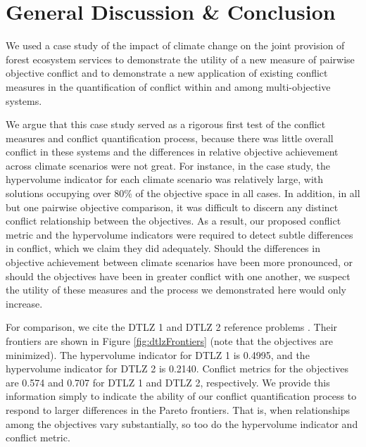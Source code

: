 \chapter{General Discussion \& Conclusion}
We used a case study of the impact of climate change on the joint provision of forest ecosystem services to demonstrate the utility of a new measure of pairwise objective conflict and to demonstrate a new application of existing conflict measures in the quantification of conflict within and among multi-objective systems.

We argue that this case study served as a rigorous first test of the conflict measures and conflict quantification process, because there was little overall conflict in these systems and the differences in relative objective achievement across climate scenarios were not great. For instance, in the case study, the hypervolume indicator for each climate scenario was relatively large, with solutions occupying over 80\% of the objective space in all cases. In addition, in all but one pairwise objective comparison, it was difficult to discern any distinct conflict relationship between the objectives. As a result, our proposed conflict metric and the hypervolume indicators were required to detect subtle differences in conflict, which we claim they did adequately. Should the differences in objective achievement between climate scenarios have been more pronounced, or should the objectives have been in greater conflict with one another, we suspect the utility of these measures and the process we demonstrated here would only increase.

For comparison, we cite the DTLZ 1 and DTLZ 2 reference problems \cite{deb2002scalable}. Their frontiers are shown in Figure \ref{fig:dtlzFrontiers} (note that the objectives are minimized). The hypervolume indicator for DTLZ 1 is 0.4995, and the hypervolume indicator for DTLZ 2 is 0.2140. Conflict metrics for the objectives are 0.574 and 0.707 for DTLZ 1 and DTLZ 2, respectively. We provide this information simply to indicate the ability of our conflict quantification process to respond to larger differences in the Pareto frontiers. That is, when relationships among the objectives vary substantially, so too do the hypervolume indicator and conflict metric.

